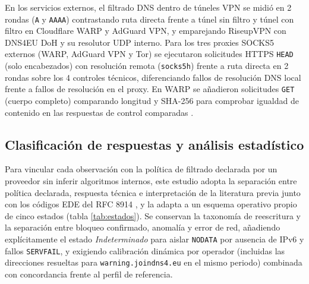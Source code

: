 \documentclass[10pt,a4paper]{article}
\begin{document}
En los servicios externos, el filtrado DNS dentro de túneles VPN se midió en 2 rondas (\texttt{A} y \texttt{AAAA}) contrastando ruta directa frente a túnel sin filtro y túnel con filtro en Cloudflare WARP y AdGuard VPN, y emparejando RiseupVPN con DNS4EU DoH y su resolutor UDP interno. Para los tres proxies SOCKS5 externos (WARP, AdGuard VPN y Tor) se ejecutaron solicitudes HTTPS \texttt{HEAD} (solo encabezados) con resolución remota (\texttt{socks5h}) frente a ruta directa en 2 rondas sobre los 4 controles técnicos, diferenciando fallos de resolución DNS local frente a fallos de resolución en el proxy. En WARP se añadieron solicitudes \texttt{GET} (cuerpo completo) comparando longitud y SHA-256 para comprobar igualdad de contenido en las respuestas de control comparadas \cite{tsirantonakis2018proxy}.

\subsection{Clasificación de respuestas y análisis estadístico}\label{subsec:metodo-analisis}

Para vincular cada observación con la política de filtrado declarada por un proveedor sin inferir algoritmos internos, este estudio adopta la separación entre política declarada, respuesta técnica e interpretación de la literatura previa \cite{rojas2025,rojas2025ieee,liu2024,ooni2012} junto con los códigos EDE del RFC 8914 \cite{rfc8914}, y la adapta a un esquema operativo propio de cinco estados (tabla \ref{tab:estados}). Se conservan la taxonomía de reescritura y la separación entre bloqueo confirmado, anomalía y error de red, añadiendo explícitamente el estado \emph{Indeterminado} para aislar \texttt{NODATA} por ausencia de IPv6 y fallos \texttt{SERVFAIL}, y exigiendo calibración dinámica por operador (incluidas las direcciones resueltas para \texttt{warning.joindns4.eu} en el mismo periodo) combinada con concordancia frente al perfil de referencia.
\end{document}
